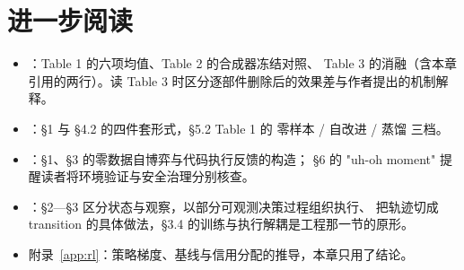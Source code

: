 \section*{进一步阅读}
\begin{itemize}
\sloppy
  \item \cite{ttcs-2601}：Table 1 的六项均值、Table 2 的合成器冻结对照、
        Table 3 的消融（含本章引用的两行）。读 Table 3 时区分逐部件删除后的效果差与作者提出的机制解释。
  \item \cite{self-challenging-2506}：§1 与 §4.2 的四件套形式，§5.2 Table 1 的
        零样本  / 自改进  / 蒸馏  三档。
  \item \cite{absolute-zero-2505}：§1、§3 的零数据自博弈与代码执行反馈的构造；
        §6 的 "uh-oh moment" 提醒读者将环境验证与安全治理分别核查。
  \item \cite{agent-lightning-2508}：§2—§3 区分状态与观察，以部分可观测决策过程组织执行、
        把轨迹切成 transition 的具体做法，§3.4 的训练与执行解耦是工程那一节的原形。
  \item 附录~\ref{app:rl}：策略梯度、基线与信用分配的推导，本章只用了结论。
\end{itemize}
